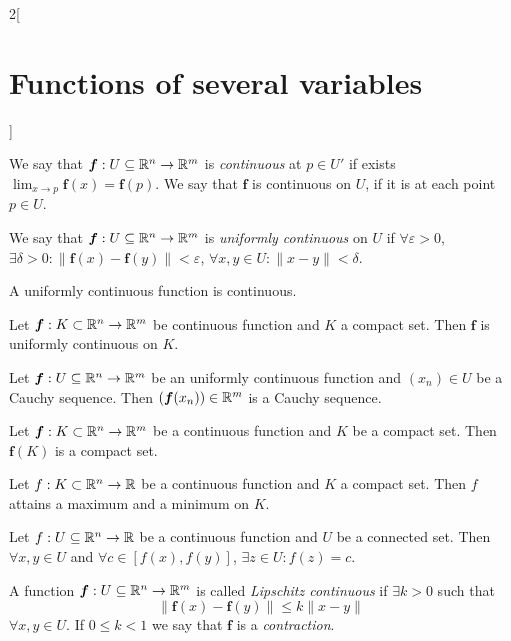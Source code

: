 \documentclass[../../../main.tex]{subfiles}
\begin{document}
\begin{multicols}{2}[\section{Functions of several variables}]
\begin{lemma}
\end{lemma}
\begin{definition}
We say that $\mathbf{\boldsymbol{f}}:U\subseteq\mathbb{R}^n\rightarrow\mathbb{R}^m$ is \textit{continuous} at $p\in U'$ if exists $\displaystyle\lim_{x\to p}\mathbf{\boldsymbol{f}}(x)=\mathbf{\boldsymbol{f}}(p)$. We say that $\mathbf{\boldsymbol{f}}$ is continuous on $U$, if it is at each point $p\in U$.
\end{definition}
\begin{definition}
We say that $\mathbf{\boldsymbol{f}}:U\subseteq\mathbb{R}^n\rightarrow\mathbb{R}^m$ is \textit{uniformly continuous} on $U$ if $\forall\varepsilon>0$, $\exists\delta>0:\|\mathbf{\boldsymbol{f}}(x)-\mathbf{\boldsymbol{f}}(y)\|<\varepsilon$, $\forall x,y\in U:\|x-y\|<\delta$.
\end{definition}
\begin{corollary}
A uniformly continuous function is continuous.
\end{corollary}
\begin{theorem}
Let $\mathbf{\boldsymbol{f}}:K\subset\mathbb{R}^n\rightarrow\mathbb{R}^m$ be continuous function and $K$ a compact set. Then $\mathbf{\boldsymbol{f}}$ is uniformly continuous on $K$.
\end{theorem}
\begin{theorem}
Let $\mathbf{\boldsymbol{f}}:U\subseteq\mathbb{R}^n\rightarrow\mathbb{R}^m$ be an uniformly continuous function and $(x_n)\in U$ be a Cauchy sequence. Then $(\mathbf{\boldsymbol{f}}(x_n))\in\mathbb{R}^m$ is a Cauchy sequence.
\end{theorem}
\begin{theorem}
Let $\mathbf{\boldsymbol{f}}:K\subset\mathbb{R}^n\rightarrow\mathbb{R}^m$ be a continuous function and $K$ be a compact set. Then $\mathbf{\boldsymbol{f}}(K)$ is a compact set.
\end{theorem}
\begin{theorem}
Let $f:K\subset\mathbb{R}^n\rightarrow\mathbb{R} $ be a continuous function and $K$ a compact set. Then $f$ attains a maximum and a minimum on $K$.
\end{theorem}
\begin{theorem}
Let $f:U\subseteq\mathbb{R}^n\rightarrow\mathbb{R} $ be a continuous function and $U$ be a connected set. Then $\forall x,y\in U$ and $\forall c\in[f(x),f(y)]$, $\exists z\in U:f(z)=c$.
\end{theorem}
\begin{definition}
A function $\mathbf{\boldsymbol{f}}:U\subseteq\mathbb{R}^n\rightarrow\mathbb{R}^m$ is called \textit{Lipschitz continuous} if $\exists k>0$ such that $$\|\mathbf{\boldsymbol{f}}(x)-\mathbf{\boldsymbol{f}}(y)\|\leq k\|x-y\|$$ $\forall x,y\in U$. If $0\leq k<1$ we say that $\mathbf{\boldsymbol{f}}$ is a \textit{contraction}.

\end{definition}
\end{multicols}
\end{document}
